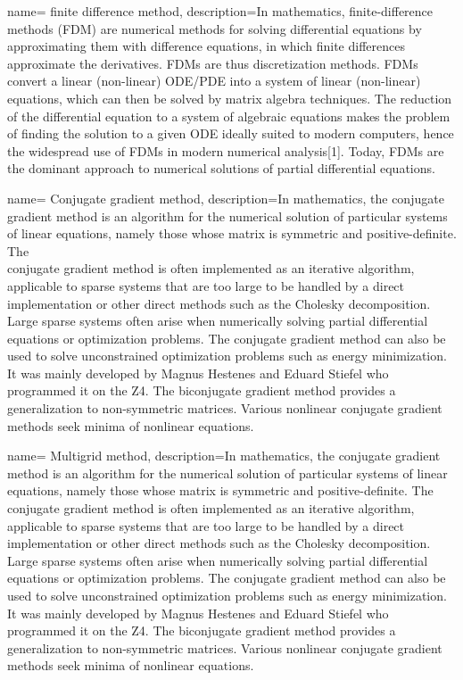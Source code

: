 {
        name= finite difference method,
        description={In mathematics, finite-difference methods (FDM) are numerical methods for solving differential equations by approximating them with difference equations, in which finite differences approximate the derivatives. FDMs are thus discretization methods. FDMs convert a linear (non-linear) ODE/PDE into a system of linear (non-linear) equations, which can then be solved by matrix algebra techniques. The reduction of the differential equation to a system of algebraic equations makes the problem of finding the solution to a given ODE ideally suited to modern computers, hence the widespread use of FDMs in modern numerical analysis[1]. Today, FDMs are the dominant approach to numerical solutions of partial differential equations.}
}

{
        name= Conjugate gradient method,
        description={In mathematics, the conjugate gradient method is an algorithm for the numerical solution of particular systems of linear equations, namely those whose matrix is symmetric and positive-definite. The \\ conjugate gradient method is often implemented as an iterative algorithm, applicable to sparse systems that are too large to be handled by a direct implementation or other direct methods such as the Cholesky decomposition. Large sparse systems often arise when numerically solving partial differential equations or optimization problems. The conjugate gradient method can also be used to solve unconstrained optimization problems such as energy minimization. It was mainly developed by Magnus Hestenes and Eduard Stiefel who programmed it on the Z4. The biconjugate gradient method provides a generalization to non-symmetric matrices. Various nonlinear conjugate gradient methods seek minima of nonlinear equations.}
}

{
        name= Multigrid method,
        description={In mathematics, the conjugate gradient method is an algorithm for the numerical solution of particular systems of linear equations, namely those whose matrix is symmetric and positive-definite. The conjugate gradient method is often implemented as an iterative algorithm, applicable to sparse systems that are too large to be handled by a direct implementation or other direct methods such as the Cholesky decomposition. Large sparse systems often arise when numerically solving partial differential equations or optimization problems. The conjugate gradient method can also be used to solve unconstrained optimization problems such as energy minimization. It was mainly developed by Magnus Hestenes and Eduard Stiefel who programmed it on the Z4. The biconjugate gradient method provides a generalization to non-symmetric matrices. Various nonlinear conjugate gradient methods seek minima of nonlinear equations.}
}

